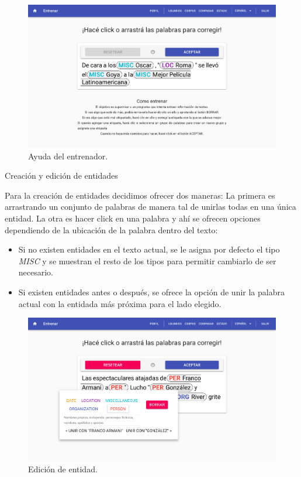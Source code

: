 \documentclass[12pt,a4paper,]{scrartcl}
\providecommand{\tightlist}{%
  \setlength{\itemsep}{0pt}\setlength{\parskip}{0pt}}
\begin{document}
\begin{figure}[H]

{\centering \includegraphics{assets/logic/train-help.pdf} 

}

\caption{Ayuda del entrenador.}\label{fig:logic-train-help}
\end{figure}

Creación y edición de entidades

Para la creación de entidades decidimos ofrecer dos maneras: La primera es arrastrando un conjunto de palabras de manera tal de unirlas todas en una única entidad.
La otra es hacer click en una palabra y ahí se ofrecen opciones dependiendo de la ubicación de la palabra dentro del texto:

\begin{itemize}
\tightlist
\item
  Si no existen entidades en el texto actual, se le asigna por defecto el tipo \emph{MISC} y se muestran el resto de los tipos para permitir cambiarlo de ser necesario.
\item
  Si existen entidades antes o después, se ofrece la opción de unir la palabra actual con la entidada más próxima para el lado elegido.
\end{itemize}

\begin{figure}[H]

{\centering \includegraphics{assets/logic/train-popup.pdf} 

}

\caption{Edición de entidad.}\label{fig:logic-train-popup}
\end{figure}
\end{document}
